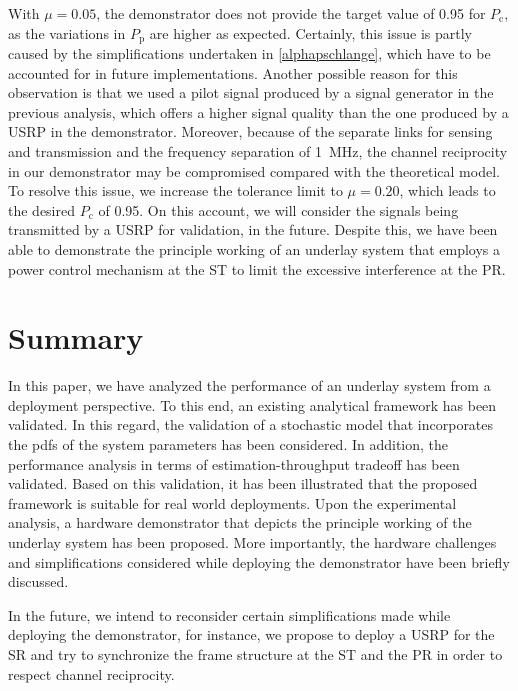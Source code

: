 With $\mu = 0.05$, the demonstrator does not provide the target value of 0.95 for $P_\textrm{c}$, as the variations in $P_\textrm{p}$ are higher as expected. Certainly, this issue is partly caused by the simplifications undertaken in \ref{alphapschlange}, which have to be accounted for in future implementations. Another possible reason for this observation is that we used a pilot signal produced by a signal generator in the previous analysis, which offers a higher signal quality than the one produced by a USRP in the demonstrator. Moreover, because of the separate links for sensing and transmission and the frequency separation of \SI{1}{MHz}, the channel reciprocity in our demonstrator may be compromised compared with the theoretical model. To resolve this issue, we increase the tolerance limit to $\mu = 0.20$, which leads to the desired $P_\textrm{c}$ of 0.95. On this account, we will consider the signals being transmitted by a USRP for validation, in the future. Despite this, we have been able to demonstrate the principle working of an underlay system that employs a power control mechanism at the ST to limit the excessive interference at the PR.


\section{Summary}
\label{con}

In this paper, we have analyzed the performance of an underlay system from a deployment perspective. To this end, an existing analytical framework \cite{Kaushik15} has been validated. In this regard, the validation of a stochastic model that incorporates the pdfs of the system parameters has been considered. In addition, the performance analysis in terms of estimation-throughput tradeoff has been validated. Based on this validation, it has been illustrated that the proposed framework is suitable for real world deployments. Upon the experimental analysis, a hardware demonstrator that depicts the principle working of the underlay system has been proposed. More importantly, the hardware challenges and simplifications considered while deploying the demonstrator have been briefly discussed.  

In the future, we intend to reconsider certain simplifications made while deploying the demonstrator, for instance, we propose to deploy a USRP for the SR and try to synchronize the frame structure at the ST and the PR in order to respect channel reciprocity.












